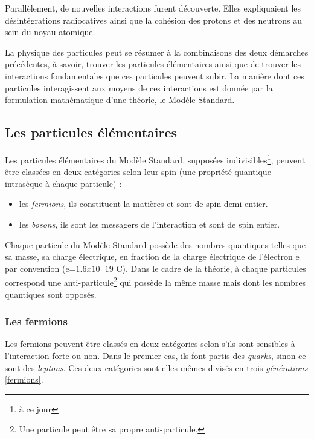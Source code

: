 Parallèlement, de nouvelles interactions furent découverte. Elles expliquaient les désintégrations radiocatives ainsi que la cohésion des protons et des neutrons au sein du noyau atomique.

La physique des particules peut se résumer à la combinaisons des deux démarches précédentes, à savoir, trouver les particules élémentaires ainsi que de trouver les interactions fondamentales que ces particules peuvent subir. La manière dont ces particules interagissent aux moyens de ces interactions est donnée par la formulation mathématique d'une théorie, le Modèle Standard.

\subsection{Les particules élémentaires}
Les particules élémentaires du Modèle Standard, supposées indivisibles\footnote{à ce jour}, peuvent être classées en deux catégories selon leur spin (une propriété quantique intrasèque à chaque particule) :
\begin{itemize}[label=$\bullet$]
\item les \textit{fermions}, ils constituent la matières et sont de spin demi-entier.
\item les \textit{bosons}, ils sont les messagers de l'interaction et sont de spin entier.
\end{itemize}
Chaque particule du Modèle Standard possède des nombres quantiques telles que sa masse, sa charge électrique, en fraction de la charge électrique de l'électron e par convention (e=$1.6x10^-19$ C). Dans le cadre de la théorie, à chaque particules correspond une anti-particule\footnote{Une particule peut être sa propre anti-particule.} qui possède la même masse mais dont les nombres quantiques sont opposés.

\subsubsection{Les fermions}
Les fermions peuvent être classés en deux catégories selon s'ils sont sensibles à l'interaction forte ou non. Dans le premier cas, ils font partis des \textit{quarks}, sinon ce sont des \textit{leptons}. Ces deux catégories sont elles-mêmes divisés en trois \textit{générations} \ref{fermions}.

